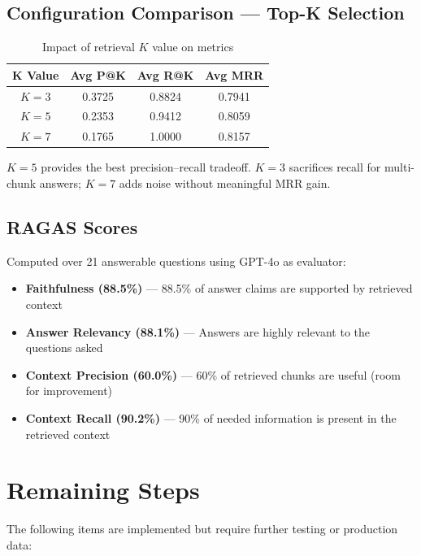 \documentclass[12pt, a4paper]{article}
\begin{document}
\subsection{Configuration Comparison — Top-K Selection}

\begin{table}[H]
\centering
\caption{Impact of retrieval $K$ value on metrics}
\begin{tabular}{c c c c}
\toprule
\textbf{K Value} & \textbf{Avg P@K} & \textbf{Avg R@K} & \textbf{Avg MRR} \\
\midrule
$K=3$ & 0.3725 & 0.8824 & 0.7941 \\
$K=5$ & 0.2353 & 0.9412 & 0.8059 \\
$K=7$ & 0.1765 & 1.0000 & 0.8157 \\
\bottomrule
\end{tabular}
\label{tab:topk}
\end{table}

$K=5$ provides the best precision--recall tradeoff. $K=3$ sacrifices recall for multi-chunk answers; $K=7$ adds noise without meaningful MRR gain.

\subsection{RAGAS Scores}

Computed over 21 answerable questions using GPT-4o as evaluator:

\begin{itemize}[leftmargin=1.5em]
    \item \textbf{Faithfulness (88.5\%)} — 88.5\% of answer claims are supported by retrieved context
    \item \textbf{Answer Relevancy (88.1\%)} — Answers are highly relevant to the questions asked
    \item \textbf{Context Precision (60.0\%)} — 60\% of retrieved chunks are useful (room for improvement)
    \item \textbf{Context Recall (90.2\%)} — 90\% of needed information is present in the retrieved context
\end{itemize}

\section{Remaining Steps}

The following items are implemented but require further testing or production data:
\end{document}
